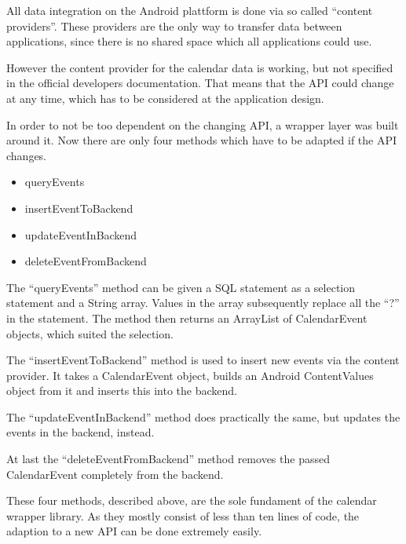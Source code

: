 All data integration on the Android plattform is done via
so called ``content providers''. These providers are the
only way to transfer data between applications, since there
is no shared space which all applications could use.

However the content provider for the calendar data is
working, but not specified in the official developers
documentation. That means that the API could change at
any time, which has to be considered at the application
design.

In order to not be too dependent on the changing API, a
wrapper layer was built around it. Now there are only four
methods which have to be adapted if the API changes.
\begin{itemize}
  \item queryEvents
  \item insertEventToBackend
  \item updateEventInBackend
  \item deleteEventFromBackend
\end{itemize}

The ``queryEvents'' method can be given a SQL statement as a selection
statement and a String array. Values in the array subsequently replace all
the ``?'' in the statement. The method then returns an ArrayList of
CalendarEvent objects, which suited the selection.

The ``insertEventToBackend'' method is used to insert new events via the
content provider. It takes a CalendarEvent object, builds an Android
ContentValues object from it and inserts this into the backend.

The ``updateEventInBackend'' method does practically the same, but updates
the events in the backend, instead.

At last the ``deleteEventFromBackend'' method removes the passed CalendarEvent
completely from the backend.

These four methods, described above, are the sole fundament of the calendar
wrapper library. As they mostly consist of less than ten lines of code,
the adaption to a new API can be done extremely easily.

